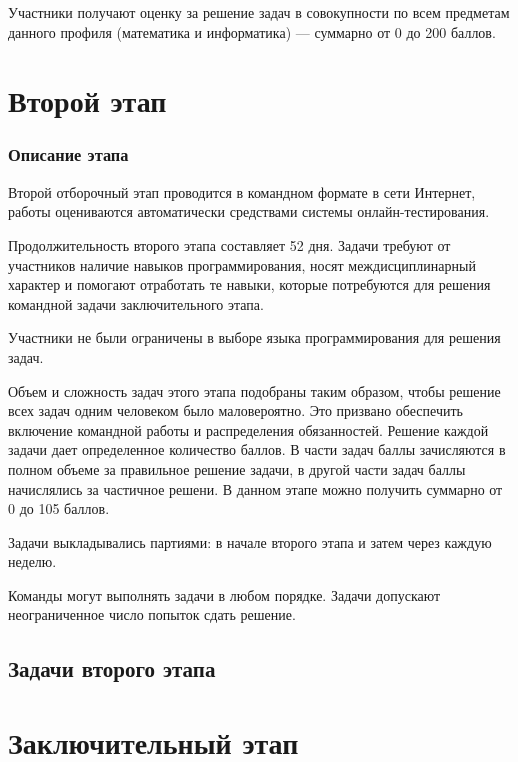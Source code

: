 \documentclass[a4paper,12pt,oneside]{book}
\begin{document}
Участники получают оценку за решение задач в совокупности по всем предметам данного профиля (математика и информатика) --- суммарно от 0 до 200 баллов.
  


 
\part{Второй этап}
\newpage

\section*{Описание этапа}

Второй отборочный этап проводится в командном формате в сети Интернет, работы оцениваются автоматически средствами системы онлайн-тестирования.

Продолжительность второго этапа составляет 52 дня. Задачи требуют от участников наличие навыков программирования, носят междисциплинарный характер и помогают отработать те навыки, которые потребуются для решения командной задачи заключительного этапа.

Участники не были ограничены в выборе языка программирования для решения задач.

Объем и сложность задач этого этапа подобраны таким образом, чтобы решение всех задач одним человеком было маловероятно. Это призвано обеспечить включение командной работы и распределения обязанностей. Решение каждой задачи дает определенное количество баллов. В части задач баллы зачисляются в полном объеме за правильное решение задачи, в другой части задач баллы начислялись за частичное решени. В данном этапе можно получить суммарно от 0 до 105 баллов.

Задачи выкладывались партиями: в начале второго этапа и затем через каждую неделю.

Команды могут выполнять задачи в любом порядке. Задачи допускают неограниченное число попыток сдать решение.

\clearpage
\chapter{Задачи второго этапа}


\part{Заключительный этап}
 
\end{document}
